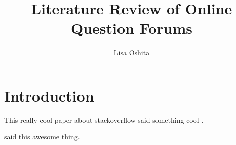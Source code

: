 \documentclass[12pt]{article}
\title{Literature Review of Online Question Forums}
\author{Lisa Oshita}
\date{}
\begin{document}
\maketitle

\section{Introduction}


This really cool paper about stackoverflow said something cool \citep{Ponzanelli2014}.


\cite{Ponzanelli2014} said this awesome thing.




\end{document}
